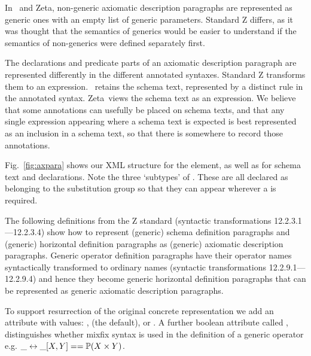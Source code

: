 \documentclass{llncs}  %
\newcommand{\Zeta}{Zeta}
\begin{document}
In \CADiZ\ and \Zeta,
non-generic axiomatic description paragraphs are represented
as generic ones with an empty list of generic parameters.
Standard Z differs, as it was thought that the semantics of generics
would be easier to understand if the semantics of non-generics
were defined separately first.

The declarations and predicate parts of an axiomatic description paragraph
are represented differently in the different annotated syntaxes.
Standard Z transforms them to an expression.
\CADiZ\ retains the schema text,
represented by a distinct rule in the annotated syntax.
\Zeta\ views the schema text as an expression.
We believe that some annotations can usefully be placed on schema texts,
and that any single expression appearing where a schema text is expected
is best represented as an inclusion in a schema text,
so that there is somewhere to record those annotations.

Fig.~\ref{fig:axpara} shows our XML structure for the 
element, as well as for schema text and declarations.  Note the
three `subtypes' of .  These are all declared as belonging to
the  substitution group so that they can appear wherever
a  is required.

The following definitions from the Z standard
(syntactic transformations 12.2.3.1---12.2.3.4)
show how to represent (generic) schema definition paragraphs
and (generic) horizontal definition paragraphs
as (generic) axiomatic description paragraphs.
\DTschemadef
\DTgenschemadef
\DThorizdef
\DTgenhorizdef
Generic operator definition paragraphs have their operator names
syntactically transformed to ordinary names
(syntactic transformations 12.2.9.1---12.2.9.4)
and hence they become generic horizontal definition paragraphs
that can be represented as generic axiomatic description paragraphs.

To support resurrection of the original concrete representation we add an
attribute  with values: ,  (the
default), or .  A further boolean attribute called
, distinguishes whether mixfix syntax is used in the 
definition of a generic operator
e.g. $\_ \rel \_ [X,Y] == \power(X \cross Y)$.
\end{document}
